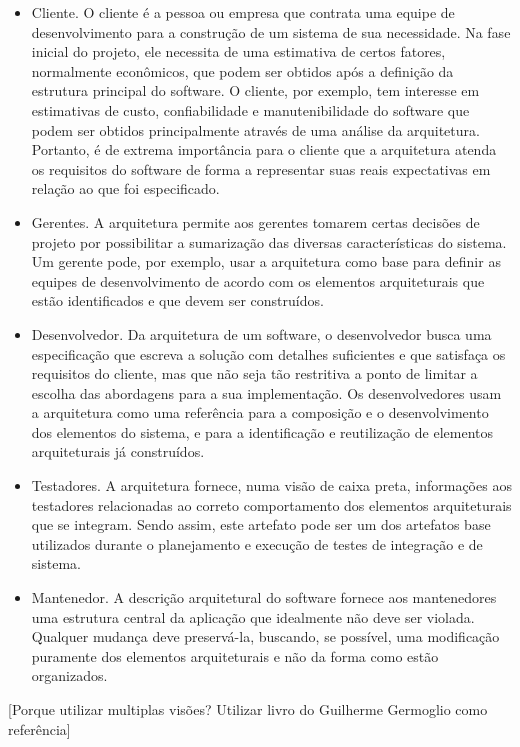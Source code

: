 \begin{itemize}
\item Cliente. O cliente é a pessoa ou empresa que contrata uma equipe de desenvolvimento para a construção de um sistema de sua necessidade. Na fase inicial do projeto, ele necessita de uma estimativa de certos fatores, normalmente econômicos, que podem ser obtidos após a definição da estrutura principal do software. O cliente, por exemplo, tem interesse em estimativas de custo, confiabilidade e manutenibilidade do software que podem ser obtidos principalmente através de uma análise da arquitetura. Portanto, é de extrema importância para o cliente que a arquitetura atenda os requisitos do software de forma a representar suas reais expectativas em relação ao que foi especificado.
\item Gerentes. A arquitetura permite aos gerentes tomarem certas decisões de projeto por possibilitar a sumarização das diversas características do sistema. Um gerente pode, por exemplo, usar a arquitetura como base para definir as equipes de desenvolvimento de acordo com os elementos arquiteturais que estão identificados e que devem ser construídos.
\item Desenvolvedor. Da arquitetura de um software, o desenvolvedor busca uma especificação que escreva a solução com detalhes suficientes e que satisfaça os requisitos do cliente, mas que não seja tão restritiva a ponto de limitar a escolha das abordagens para a sua implementação. Os desenvolvedores usam a arquitetura como uma referência para a composição e o desenvolvimento dos elementos do sistema, e para a identificação e reutilização de elementos arquiteturais já construídos.
\item Testadores. A arquitetura fornece, numa visão de caixa preta, informações aos testadores relacionadas ao correto comportamento dos elementos arquiteturais que se integram. Sendo assim, este artefato pode ser um dos artefatos base utilizados durante o planejamento e execução de testes de integração e de sistema.
\item Mantenedor. A descrição arquitetural do software fornece aos mantenedores uma estrutura central da aplicação que idealmente não deve ser violada. Qualquer mudança deve preservá-la, buscando, se possível, uma modificação puramente dos elementos arquiteturais e não da forma como estão organizados.
\end{itemize}

[Porque utilizar multiplas visões? Utilizar livro do Guilherme Germoglio como referência]

